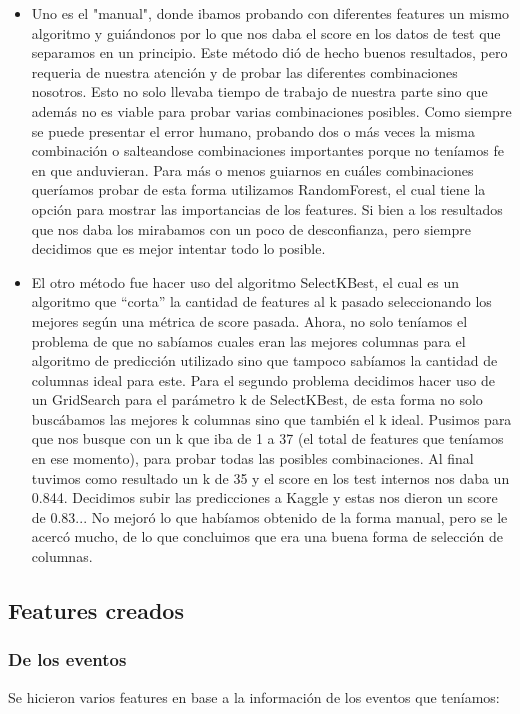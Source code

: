 \documentclass[a4paper]{article}
\begin{document}
        \begin{itemize}
            \item Uno es el "manual", donde ibamos probando con diferentes features un mismo algoritmo y guiándonos por lo que nos daba el score en los datos de test que separamos en un principio. Este método dió de hecho buenos resultados, pero requeria de nuestra atención y de probar las diferentes combinaciones nosotros. Esto no solo llevaba tiempo de trabajo de nuestra parte sino que además no es viable para probar varias combinaciones posibles. Como siempre se puede presentar el error humano, probando dos o más veces la misma combinación o salteandose combinaciones importantes porque no teníamos fe en que anduvieran. Para más o menos guiarnos en cuáles combinaciones queríamos probar de esta forma utilizamos RandomForest, el cual tiene la opción para mostrar las importancias de los features. Si bien a los resultados que nos daba los mirabamos con un poco de desconfianza, pero siempre decidimos que es mejor intentar todo lo posible.
            
            \item El otro método fue hacer uso del algoritmo SelectKBest, el cual es un algoritmo que ``corta'' la cantidad de features al k pasado seleccionando los mejores según una métrica de score pasada. Ahora, no solo teníamos el problema de que no sabíamos cuales eran las mejores columnas para el algoritmo de predicción utilizado sino que tampoco sabíamos la cantidad de columnas ideal para este. Para el segundo problema decidimos hacer uso de un GridSearch para el parámetro k de SelectKBest, de esta forma no solo buscábamos las mejores k columnas sino que también el k ideal. Pusimos para que nos busque con un k que iba de 1 a 37 (el total de features que teníamos en ese momento), para probar todas las posibles combinaciones. Al final tuvimos como resultado un k de 35 y el score en los test internos nos daba un 0.844. Decidimos subir las predicciones a Kaggle y estas nos dieron un score de 0.83... No mejoró lo que habíamos obtenido de la forma manual, pero se le acercó mucho, de lo que concluimos que era una buena forma de selección de columnas.
        \end{itemize}
        
    \subsection{Features creados}\label{subsec:features creados}

        \subsubsection{De los eventos}\label{subsubsec:eventos}
        Se hicieron varios features en base a la información de los eventos que teníamos:\\
        
\end{document}
